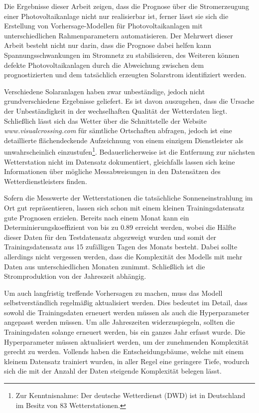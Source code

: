 \documentclass[12pt, a4paper]{article}
\begin{document}
Die Ergebnisse dieser Arbeit zeigen, dass die Prognose über die Stromerzeugung einer Photovoltaikanlage nicht nur realisierbar ist, ferner lässt sie sich die Erstellung von Vorhersage-Modellen für Photovoltaikanlagen mit unterschiedlichen Rahmenparametern automatisieren. Der Mehrwert dieser Arbeit besteht nicht nur darin, dass die Prognose dabei helfen kann Spannungsschwankungen im Stromnetz zu stabilisieren, des Weiteren können defekte Photovoltaikanlagen durch die Abweichung zwischen dem prognostizierten und dem tatsächlich erzeugten Solarstrom identifiziert werden.

Verschiedene Solaranlagen haben zwar unbeständige, jedoch nicht grundverschiedene Ergebnisse geliefert. Es ist davon auszugehen, dass die Ursache der Unbeständigkeit in der wechselhaften Qualität der Wetterdaten liegt. Schließlich lässt sich das Wetter über die Schnittstelle der Website \textit{www.visualcrossing.com} für sämtliche Ortschaften abfragen, jedoch ist eine detaillierte flächendeckende Aufzeichnung von einem einzigem Dienstleister als unwahrscheinlich einzustufen\footnote{Zur Kenntnisnahme: Der deutsche Wetterdienst (DWD) ist in Deutschland im Besitz von 83 Wetterstationen.}. Bedauerlicherweise ist die Entfernung zur nächsten Wetterstation nicht im Datensatz dokumentiert, gleichfalls lassen sich keine Informationen über mögliche Messabweisungen in den Datensätzen des Wetterdienstleisters finden.


Sofern die Messwerte der Wetterstationen die tatsächliche Sonneneinstrahlung im Ort gut repräsentieren, lassen sich schon mit einem kleinen Trainingsdatensatz gute Prognosen erzielen. Bereits nach einem Monat kann ein Determinierungskoeffizient von bis zu 0.89 erreicht werden, wobei die Hälfte dieser Daten für den Testdatensatz abgezweigt wurden und somit der Trainingsdatensatz aus 15 zufälligen Tagen des Monats besteht. Dabei sollte allerdings nicht vergessen werden, dass die Komplexität des Modells mit mehr Daten aus unterschiedlichen Monaten zunimmt. Schließlich ist die Stromproduktion von der Jahreszeit abhängig. 

Um auch langfristig treffende Vorhersagen zu machen, muss das Modell selbstverständlich regelmäßig aktualisiert werden. Dies bedeutet im Detail, dass sowohl die Trainingsdaten erneuert werden müssen als auch die Hyperparameter angepasst werden müssen. Um alle Jahreszeiten widerzuspiegeln, sollten die Trainingsdaten solange erneuert werden, bis ein ganzes Jahr erfasst wurde. Die Hyperparameter müssen aktualisiert werden, um der zunehmenden Komplexität gerecht zu werden. Vollends haben die Entscheidungsbäume, welche mit einem kleinem Datensatz trainiert wurden, in aller Regel eine geringere Tiefe, wodurch sich die mit der Anzahl der Daten steigende Komplexität belegen lässt.
\end{document}
